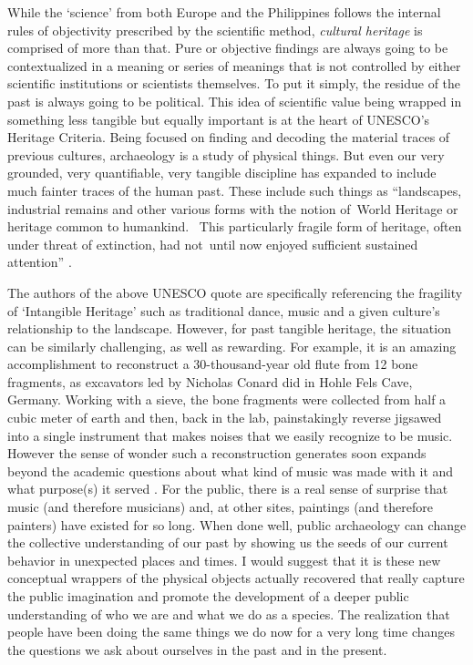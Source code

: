 \documentclass[english]{ijsra}
\begin{document}
While the ‘science’ from both Europe and the Philippines follows the internal rules of objectivity prescribed by the scientific method, \textit{cultural heritage} is comprised of more than that. Pure or objective findings are always going to be contextualized in a meaning or series of meanings that is not controlled by either scientific institutions or scientists themselves. To put it simply, the residue of the past is always going to be political. This idea of scientific value being wrapped in something less tangible but equally important is at the heart of UNESCO’s Heritage Criteria. Being focused on finding and decoding the material traces of previous cultures, archaeology is a study of physical things. But even our very grounded, very quantifiable, very tangible discipline has expanded to include much fainter traces of the human past. These include such things as “landscapes, industrial remains and other various forms with the notion of World Heritage or heritage common to humankind.  This particularly fragile form of heritage, often under threat of extinction, had not until now enjoyed sufficient sustained attention” \parencite{Cairo_2015}. 

The authors of the above UNESCO quote are specifically referencing the fragility of ‘Intangible Heritage’ such as traditional dance, music and a given culture’s relationship to the landscape. However, for past tangible heritage, the situation can be similarly challenging, as well as rewarding. For example, it is an amazing accomplishment to reconstruct a 30-thousand-year old flute from 12 bone fragments, as excavators led by Nicholas Conard did in Hohle Fels Cave, Germany. Working with a sieve, the bone fragments were collected from half a cubic meter of earth and then, back in the lab, painstakingly reverse jigsawed into a single instrument that makes noises that we easily recognize to be music.  However the sense of wonder such a reconstruction generates soon expands beyond the academic questions about what kind of music was made with it and what purpose(s) it served \parencite{Conard_2009}. 
For the public, there is a real sense of surprise that music (and therefore musicians) and, at other sites, paintings (and therefore painters) have existed for so long. When done well, public archaeology can change the collective understanding of our past by showing us the seeds of our current behavior in unexpected places and times. I would suggest that it is these new conceptual wrappers of the physical objects actually recovered that really capture the public imagination and promote the development of a deeper public understanding of who we are and what we do as a species. The realization that people have been doing the same things we do now for a very long time changes the questions we ask about ourselves in the past and in the present. 
\end{document}
